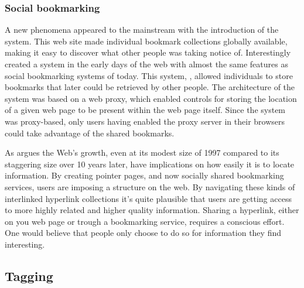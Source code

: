\subsubsection{Social bookmarking}

A new phenomena appeared to the mainstream with the introduction of the
 system. This web site made individual
bookmark collections globally available, making it easy to discover what other
people was taking notice of. Interestingly \citet{keller97} created a system
in the early days of the web with almost the same features as social
bookmarking systems of today. This system, , allowed
individuals to store bookmarks that later could be retrieved by other people.
The architecture of the system was based on a web proxy, which enabled
controls for storing the location of a given web page to be present within the
web page itself. Since the system was proxy-based, only users having enabled
the proxy server in their browsers could take advantage of the shared
bookmarks.

As \citet[]{dieberger97} argues the Web's growth, even at its modest
size of 1997 compared to its staggering size over 10 years later, have
implications on how easily it is to locate information. By creating pointer
pages, and now socially shared bookmarking services, users are imposing a
structure on the web. By navigating these kinds of interlinked hyperlink
collections it's quite plausible that users are getting access to more highly
related and higher quality information. Sharing a hyperlink, either on you web
page or trough a bookmarking service, requires a conscious effort. One would
believe that people only choose to do so for information they find
interesting.

\subsection{Tagging}


